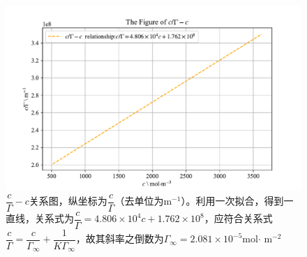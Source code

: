 \documentclass[UTF8,AutoFakeBold,a4paper]{article}
\begin{document}
\begin{figure}[h]
	\centering
	\includegraphics[scale=0.8]{Figure3}
	\caption{$\dfrac{c}{\varGamma}-c$关系图，纵坐标为$\dfrac{c}{\varGamma}$（去单位为m$^{-1}$）。利用一次拟合，得到一直线，关系式为\textcolor[rgb]{0.54,0.13,0.33}{$\dfrac{c}{\varGamma} = 4.806 \times 10^{4}c + 1.762 \times 10^{8}$}，应符合关系式\textcolor[rgb]{0.07,0.36,0.57}{$\dfrac{c}{\varGamma} = \dfrac{c}{\varGamma_{\infty}}+\dfrac{1}{K\varGamma_{\infty}}$}，故其斜率之倒数为$\varGamma_{\infty} = 2.081 \times10^{-5}$mol$\cdot$ m$^{-2}$}
	\label{fi4}
\end{figure}
\end{document}
